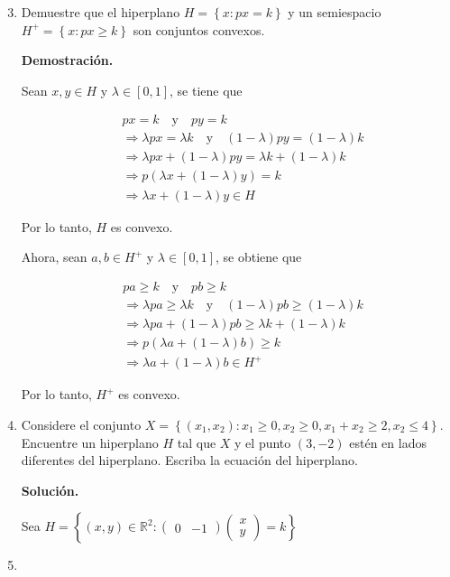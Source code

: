 \documentclass[fleqn, 12pt]{article}
\begin{document}
	\begin{enumerate}
		\setcounter{enumi}{2}
		\item Demuestre que el hiperplano $ H = \left\{ x \colon px = k \right\} $ y un semiespacio $ H^+ = \left\{ x \colon px \geq k \right\} $ son conjuntos convexos.
		
		\textbf{Demostración.}

		Sean $ x,y \in H $ y $ \lambda \in \left[ 0,1 \right] $, se tiene que

		\begin{align*}
			& px = k \quad \text{y} \quad py = k \\
			& \Longrightarrow \lambda px = \lambda k \quad \text{y} \quad \left( 1 - \lambda \right) py = \left( 1 - \lambda \right) k \\
			& \Longrightarrow \lambda px + \left( 1 - \lambda \right) py = \lambda k + \left( 1 - \lambda \right) k \\
			& \Longrightarrow p \left( \lambda x + \left( 1 - \lambda \right) y \right) = k \\
			& \Longrightarrow \lambda x + \left( 1 - \lambda \right) y \in H
		\end{align*}

		Por lo tanto, $ H $ es convexo.

		Ahora, sean $ a,b \in H^+ $ y $ \lambda \in \left[ 0,1 \right] $, se obtiene que

		\begin{align*}
			& pa \geq k \quad \text{y} \quad pb \geq k \\
			& \Longrightarrow \lambda pa \geq \lambda k \quad \text{y} \quad \left( 1 - \lambda \right) pb \geq \left( 1 - \lambda \right) k \\
			& \Longrightarrow \lambda pa + \left( 1 - \lambda \right) pb \geq \lambda k + \left( 1 - \lambda \right) k \\
			& \Longrightarrow p \left( \lambda a + \left( 1 - \lambda \right) b \right) \geq k \\
			& \Longrightarrow \lambda a + \left( 1 - \lambda \right) b \in H^+
		\end{align*}

		Por lo tanto, $ H^+ $ es convexo.

		\item Considere el conjunto $ X = \left\{ \left( x_1, x_2 \right) \colon x_1 \geq 0, x_2 \geq 0, x_1 + x_2 \geq 2, x_2 \leq 4 \right\} $. Encuentre un hiperplano $ H $ tal que $ X $ y el punto $ \left( 3, -2 \right) $ estén en lados diferentes del hiperplano. Escriba la ecuación del hiperplano.
		
		\textbf{Solución.}

		Sea $ H = \left\{ (x,y) \in \mathbb{R}^2 \colon \begin{pmatrix} 0 & -1 \end{pmatrix} \begin{pmatrix} x \\ y \end{pmatrix} = k \right\} $
		\item 
	\end{enumerate}
\end{document}
